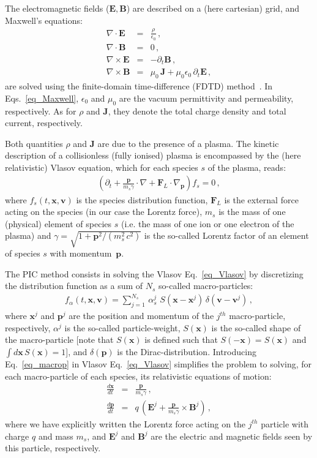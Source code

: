 \documentclass[11pt,a4paper]{article}
\newcommand{\vE}{\mathbf{E}}
\newcommand{\vB}{\mathbf{B}}
\newcommand{\vJ}{\mathbf{J}}
\newcommand{\vx}{\mathbf{x}}
\newcommand{\vp}{\mathbf{p}}
\newcommand{\vv}{\mathbf{v}}
\newcommand{\vF}{\mathbf{F}}
\begin{document}
The electromagnetic fields ($\vE,\vB$) are described on a (here cartesian) grid, and Maxwell's equations:
\begin{eqnarray}\label{eq_Maxwell}
\nabla \cdot \vE &=& \frac{\rho}{\epsilon_0} \,, \nonumber \\
\nabla \cdot \vB &=& 0 \,,\\
\nabla \times \vE &=& -\partial_t \vB \,, \nonumber\\
\nabla \times \vB &=& \mu_0\, \vJ + \mu_0 \epsilon_0\,\partial_t \vE \,, \nonumber
\end{eqnarray}
are solved using the finite-domain time-difference (FDTD) method~\cite{taflove_2005}.
In Eqs.~\eqref{eq_Maxwell}, $\epsilon_0$ and $\mu_0$ are the vacuum permittivity and permeability, respectively. 
As for $\rho$ and $\vJ$, they denote the total charge density and total current, respectively.

Both quantities $\rho$ and $\vJ$ are due to the presence of a plasma.
The kinetic description of a collisionless (fully ionised) plasma is encompassed by the (here relativistic) Vlasov equation, which for each species $s$ of the plasma, reads:
\begin{eqnarray}\label{eq_Vlasov}
\left(\partial_t  + \frac{\vp}{m_s \gamma} \cdot \nabla + \vF_L \cdot \nabla_{\vp} \right) f_s = 0\,,
\end{eqnarray}
where $f_s(t,\vx,\vv)$ is the species distribution function, $\vF_L$ is the external force acting on the species (in our case the Lorentz force), $m_s$ is the mass of one (physical) element of species $s$ (i.e. the mass of one ion or one electron of the plasma) and $\gamma = \sqrt{1+\vp^2/(m_s^2\,c^2)}$ is the so-called Lorentz factor of an element of species $s$ with momentum~$\vp$.

The PIC method consists in solving the Vlasov Eq.~\eqref{eq_Vlasov} by discretizing the distribution function as a sum of $N_s$ so-called macro-particles:
\begin{eqnarray}\label{eq_macrop}
f_\alpha (t,\vx,\vv) = \sum_{j=1}^{N_s}\,\alpha_s^j\,\,S(\vx-\vx^j)\,\delta(\vv-\vv^j)\,,
\end{eqnarray}
where $\vx^j$ and $\vp^j$ are the position and momentum of the $j^{th}$ macro-particle, respectively, $\alpha^j$ is the so-called particle-weight, $S(\vx)$ is the so-called shape of the macro-particle [note that $S(\vx)$ is defined such that $S(-\vx)=S(\vx)$ and $\int d\vx\,S(\vx)=1$], and $\delta(\vp)$ is the Dirac-distribution. Introducing Eq.~\eqref{eq_macrop} in Vlasov Eq.~\eqref{eq_Vlasov} simplifies the problem to solving, for each macro-particle of each species, its relativistic equations of motion:
\begin{eqnarray*}
\frac{d\vx}{dt}  &=& \frac{\vp}{m_s \gamma}\,,\\
\frac{d\vp}{dt}  &=&  q\,\left( \vE^j + \frac{\vp}{m_s \gamma} \times \vB^j \right)\,,
\end{eqnarray*}
where we have explicitly written the Lorentz force acting on the $j^{th}$ particle with charge $q$ and mass $m_s$, and $\vE^j$ and $\vB^j$ are the electric and magnetic fields seen by this particle, respectively.
\end{document}
